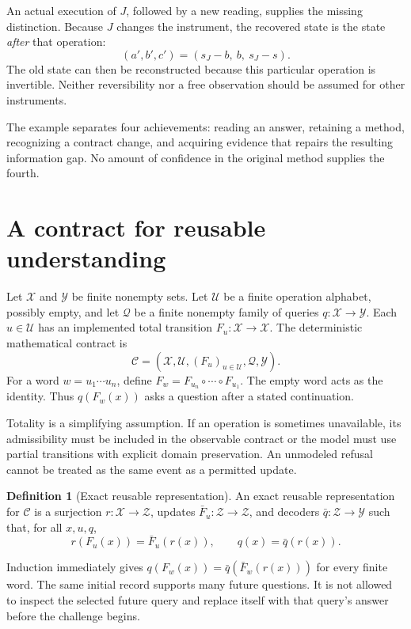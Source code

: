 \documentclass[11pt,letterpaper]{article}
\theoremstyle{plain}
\theoremstyle{definition}
\newtheorem{definition}[theorem]{Definition}
\newcommand{\X}{\mathcal X}\newcommand{\Z}{\mathcal Z}
\newcommand{\U}{\mathcal U}\newcommand{\Q}{\mathcal Q}
\newcommand{\Y}{\mathcal Y}\newcommand{\C}{\mathcal C}
\begin{document}
An actual execution of $J$, followed by a new reading, supplies the missing distinction. Because $J$ changes the instrument, the recovered state is the state \emph{after} that operation:
\begin{equation}\label{eq:recover-after-J}
(a',b',c')=(s_J-b,\ b,\ s_J-s).
\end{equation}
The old state can then be reconstructed because this particular operation is invertible. Neither reversibility nor a free observation should be assumed for other instruments.

The example separates four achievements: reading an answer, retaining a method, recognizing a contract change, and acquiring evidence that repairs the resulting information gap. No amount of confidence in the original method supplies the fourth.

\section{A contract for reusable understanding}\label{sec:contract}
Let $\X$ and $\Y$ be finite nonempty sets. Let $\U$ be a finite operation alphabet, possibly empty, and let $\Q$ be a finite nonempty family of queries $q:\X\to\Y$. Each $u\in\U$ has an implemented total transition $F_u:\X\to\X$. The deterministic mathematical contract is
\[
\C=(\X,\U,(F_u)_{u\in\U},\Q,\Y).
\]
For a word $w=u_1\cdots u_n$, define $F_w=F_{u_n}\circ\cdots\circ F_{u_1}$. The empty word acts as the identity. Thus $q(F_w(x))$ asks a question after a stated continuation.

Totality is a simplifying assumption. If an operation is sometimes unavailable, its admissibility must be included in the observable contract or the model must use partial transitions with explicit domain preservation. An unmodeled refusal cannot be treated as the same event as a permitted update.

\begin{definition}[Exact reusable representation]\label{def:representation}
An exact reusable representation for $\C$ is a surjection $r:\X\to\Z$, updates $\bar F_u:\Z\to\Z$, and decoders $\bar q:\Z\to\Y$ such that, for all $x,u,q$,
\begin{equation}\label{eq:representation-contract}
r(F_u(x))=\bar F_u(r(x)),\qquad q(x)=\bar q(r(x)).
\end{equation}
\end{definition}
Induction immediately gives $q(F_w(x))=\bar q(\bar F_w(r(x)))$ for every finite word. The same initial record supports many future questions. It is not allowed to inspect the selected future query and replace itself with that query's answer before the challenge begins.
\end{document}

